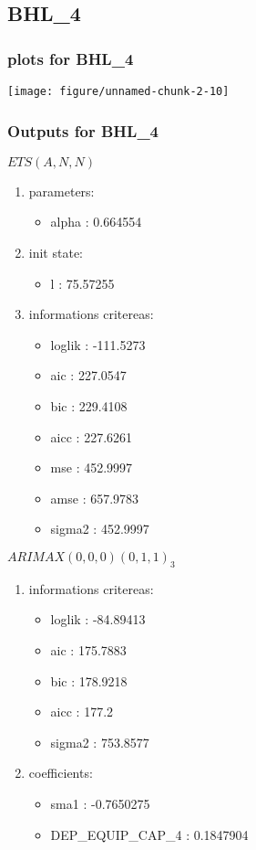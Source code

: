 \documentclass[10pt,a4paper]{article}\usepackage[]{graphicx}\usepackage[]{color}
\makeatletter
\def\maxwidth{ %
  \ifdim\Gin@nat@width>\linewidth
    \linewidth
  \else
    \Gin@nat@width
  \fi
}
\newcommand{\AaA}{\_}
\makeatother
\begin{document}
\newpage
\subsection{BHL\AaA 4}
\subsubsection{plots for BHL\AaA 4}

\texttt{[image: figure/unnamed-chunk-2-10]} 

\newpage
\subsubsection{Outputs for BHL\AaA 4}
\begin{multicols}{2}


$ ETS(A,N,N) $
\begin{enumerate}
\item parameters:
\begin{itemize}
\item  alpha :  0.664554 
\end{itemize}
\item init state:
\begin{itemize}
\item  l :  75.57255 
\end{itemize}
\item informations critereas:
\begin{itemize}
\item  loglik :  -111.5273 
\item  aic :  227.0547 
\item  bic :  229.4108 
\item  aicc :  227.6261 
\item  mse :  452.9997 
\item  amse :  657.9783 
\item  sigma2 :  452.9997 
\end{itemize}
\end{enumerate}

\columnbreak


 $ARIMAX(0,0,0)(0,1,1)_{3}$ 
\begin{enumerate}
\item informations critereas:
\begin{itemize}
\item  loglik :  -84.89413 
\item  aic :  175.7883 
\item  bic :  178.9218 
\item  aicc :  177.2 
\item  sigma2 :  753.8577 
\end{itemize}

\item coefficients:
\begin{itemize}
\item  sma1 :  -0.7650275 
\item  DEP\AaA EQUIP\AaA CAP\AaA 4 :  0.1847904 
\end{itemize}
\end{enumerate}
\end{multicols}
\end{document}
